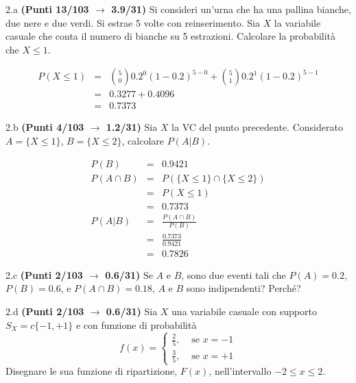 \documentclass[
  11pt,
]{book}
\theoremstyle{mytheoremstyle}
\theoremstyle{mydefstyle}
\newenvironment{sol}
  {
  \begin{tcolorbox}[enhanced,breakable,arc=0.1mm,boxrule=1pt,colback=white,colframe=iblue,
  title=\bf \fontfamily{lmss}\selectfont \hspace{.5 cm} Soluzione,drop fuzzy shadow]

}{
\end{tcolorbox}
  }
\begin{document}
2.a \textbf{(Punti 13/103 \(\rightarrow\) 3.9/31)} Si consideri un'urna che ha una pallina bianche, due nere e due verdi. Si estrae 5 volte con reinserimento. Sia \(X\) la variabile casuale che conta il numero di bianche su 5 estrazioni. Calcolare la probabilità che \(X\leq 1\).

\begin{sol}
\normalsize 
\begin{eqnarray*}
      P( X \leq 1 ) &=& \binom{ 5 }{ 0 } 0.2 ^{ 0 }(1- 0.2 )^{ 5 - 0 }+\binom{ 5 }{ 1 } 0.2 ^{ 1 }(1- 0.2 )^{ 5 - 1 } \\                 &=& 0.3277+0.4096 \\                 &=& 0.7373 
   \end{eqnarray*}
\normalsize 

\end{sol}

2.b \textbf{(Punti 4/103 \(\rightarrow\) 1.2/31)} Sia \(X\) la VC del punto precedente. Considerato \(A=\{X\leq 1\}\), \(B=\{X\leq 2\}\), calcolare \(P(A|B)\).

\begin{sol}
\begin{eqnarray*}
  P(B) &=&  0.9421\\
  P(A\cap B) &=& P( \{X \leq 1\} \cap \{X \leq 2\})\\
             &=& P(  X \leq 1)\\
             &=& 0.7373\\
  P(A|B)     &=& \frac{P(A\cap B)}{P(B)}\\
             &=& \frac{0.7373}{0.9421}\\
             &=& 0.7826
\end{eqnarray*}

\end{sol}

2.c \textbf{(Punti 2/103 \(\rightarrow\) 0.6/31)} Se \(A\) e \(B\), sono due eventi tali che \(P(A)=0.2\), \(P(B)=0.6\), e \(P(A\cap B)=0.18\), \(A\) e \(B\) sono indipendenti? Perché?

2.d \textbf{(Punti 2/103 \(\rightarrow\) 0.6/31)} Sia \(X\) una variabile casuale con supporto \(S_X=c\{-1,+1\}\) e con funzione di probabilità
\[
f(x)=\begin{cases}
\frac 25, &\text{ se $x=-1$}\\
\frac 35, &\text{ se $x=+1$}
\end{cases}
\]
Disegnare le sua funzione di ripartizione, \(F(x)\), nell'intervallo \(-2\leq x\leq 2\).
\end{document}
